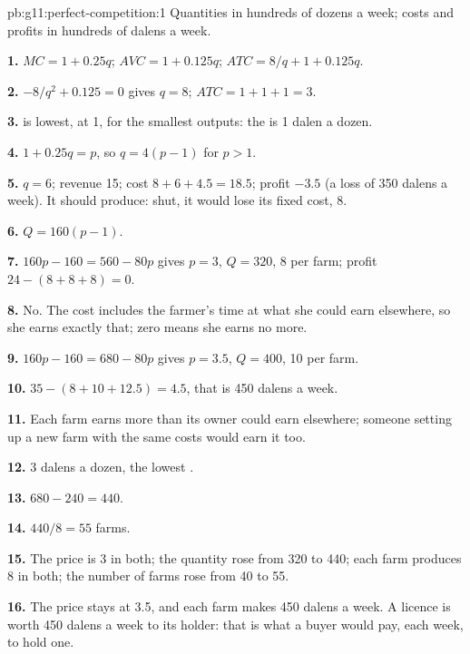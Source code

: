 \begin{solution}{pb:g11:perfect-competition:1}
Quantities in hundreds of dozens a week; costs and profits in hundreds of dalens a week.

\textbf{1.} $\mathit{MC} = 1 + 0.25q$; $\mathit{AVC} = 1 + 0.125q$; $\mathit{ATC} = 8/q + 1 + 0.125q$.

\textbf{2.} $-8/q^2 + 0.125 = 0$ gives $q = 8$; $\mathit{ATC} = 1 + 1 + 1 = 3$.

\textbf{3.}  is lowest, at 1, for the smallest outputs: the  is 1 dalen a dozen.

\textbf{4.} $1 + 0.25q = p$, so $q = 4(p - 1)$ for $p > 1$.

\textbf{5.} $q = 6$; revenue 15; cost $8 + 6 + 4.5 = 18.5$; profit $-3.5$ (a loss of 350 dalens a week). It should produce: shut, it would lose its fixed cost, 8.

\textbf{6.} $Q = 160(p - 1)$.

\textbf{7.} $160p - 160 = 560 - 80p$ gives $p = 3$, $Q = 320$, 8 per farm; profit $24 - (8 + 8 + 8) = 0$.

\textbf{8.} No. The cost includes the farmer's time at what she could earn elsewhere, so she earns exactly that; zero  means she earns no more.

\textbf{9.} $160p - 160 = 680 - 80p$ gives $p = 3.5$, $Q = 400$, 10 per farm.

\textbf{10.} $35 - (8 + 10 + 12.5) = 4.5$, that is 450 dalens a week.

\textbf{11.} Each farm earns more than its owner could earn elsewhere; someone setting up a new farm with the same costs would earn it too.

\textbf{12.} 3 dalens a dozen, the lowest .

\textbf{13.} $680 - 240 = 440$.

\textbf{14.} $440/8 = 55$ farms.

\textbf{15.} The price is 3 in both; the quantity rose from 320 to 440; each farm produces 8 in both; the number of farms rose from 40 to 55.

\textbf{16.} The price stays at 3.5, and each farm makes 450 dalens a week. A licence is worth 450 dalens a week to its holder: that is what a buyer would pay, each
week, to hold one.


\end{solution}
